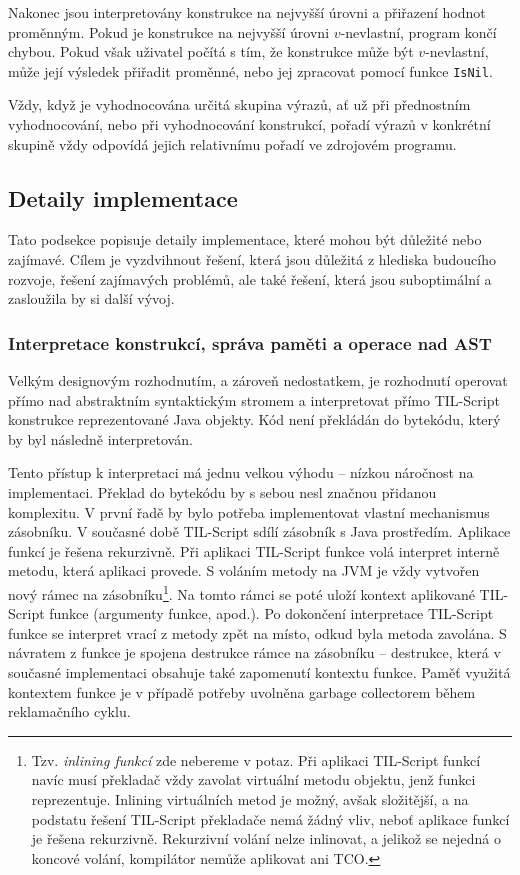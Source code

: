 Nakonec jsou interpretovány konstrukce na nejvyšší úrovni a přiřazení hodnot proměnným. Pokud je
konstrukce na nejvyšší úrovni $v$-nevlastní, program končí chybou. Pokud však uživatel počítá s tím,
že konstrukce může být $v$-nevlastní, může její výsledek přiřadit proměnné, nebo jej zpracovat
pomocí funkce \lstinline{IsNil}.

Vždy, když je vyhodnocována určitá skupina výrazů, ať už při přednostním vyhodnocování, nebo při
vyhodnocování konstrukcí, pořadí výrazů v konkrétní skupině vždy odpovídá jejich relativnímu pořadí
ve zdrojovém programu.

\subsection{Detaily implementace}

Tato podsekce popisuje detaily implementace, které mohou být důležité nebo zajímavé. Cílem je
vyzdvihnout řešení, která jsou důležitá z hlediska budoucího rozvoje, řešení zajímavých problémů,
ale také řešení, která jsou suboptimální a zasloužila by si další vývoj.

\subsubsection{
  Interpretace konstrukcí, správa paměti a operace nad AST}\label{interpretation-of-constructions}

Velkým designovým rozhodnutím, a zároveň nedostatkem, je rozhodnutí operovat přímo nad abstraktním
syntaktickým stromem a interpretovat přímo TIL-Script konstrukce reprezentované Java objekty. Kód
není překládán do bytekódu, který by byl následně interpretován.

Tento přístup k interpretaci má jednu velkou výhodu -- nízkou náročnost na implementaci. Překlad
do bytekódu by s sebou nesl značnou přidanou komplexitu. V první řadě by bylo potřeba implementovat
vlastní mechanismus zásobníku. V současné době TIL-Script sdílí zásobník s Java prostředím. Aplikace
funkcí je řešena rekurzivně. Při aplikaci TIL-Script funkce volá interpret interně metodu, která
aplikaci provede. S voláním metody na JVM je vždy vytvořen nový rámec na zásobníku\footnote{
  Tzv. \textit{inlining funkcí} zde nebereme v potaz. Při aplikaci TIL-Script funkcí navíc musí
  překladač vždy zavolat virtuální metodu objektu, jenž funkci reprezentuje. Inlining virtuálních
  metod je možný, avšak složitější, a na podstatu řešení TIL-Script překladače nemá žádný vliv,
  neboť aplikace funkcí je řešena rekurzivně. Rekurzivní volání nelze inlinovat, a jelikož se
  nejedná o koncové volání, kompilátor nemůže aplikovat ani TCO.
}.
Na tomto rámci se poté uloží kontext aplikované TIL-Script funkce (argumenty funkce, apod.).
Po dokončení interpretace TIL-Script funkce se interpret vrací z metody zpět na místo, odkud byla
metoda zavolána. S návratem z funkce je spojena destrukce rámce na zásobníku -- destrukce, která
v současné implementaci obsahuje také zapomenutí kontextu funkce. Paměť využitá kontextem funkce
je v případě potřeby uvolněna garbage collectorem během reklamačního cyklu.

